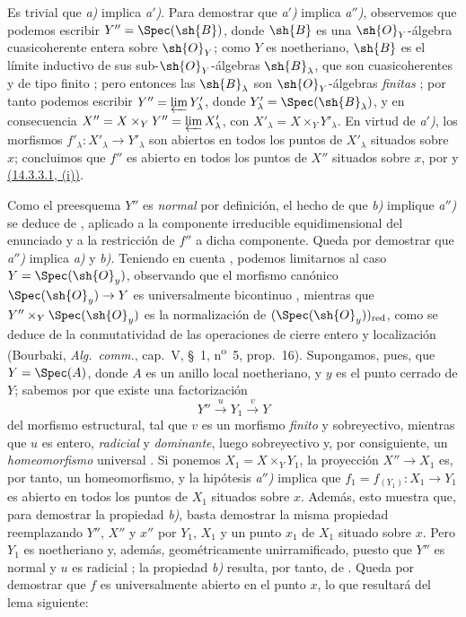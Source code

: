 Es trivial que \emph{a)} implica \emph{a$'$)}.
Para demostrar que \emph{a$'$)} implica \emph{a$''$)}, observemos que podemos escribir $Y''=\Spec(\sh{B})$, donde $\sh{B}$ es una $\sh{O}_Y$-álgebra cuasicoherente entera sobre $\sh{O}_Y$; como $Y$ es noetheriano, $\sh{B}$ es el límite inductivo de sus sub-$\sh{O}_Y$-álgebras $\sh{B}_\lambda$, que son cuasicoherentes y de tipo finito ; pero entonces las $\sh{B}_\lambda$ son $\sh{O}_Y$-álgebras \emph{finitas} ; por tanto podemos escribir $Y''=\varprojlim Y'_\lambda$, donde $Y'_\lambda=\Spec(\sh{B}_\lambda)$, y en consecuencia $X''=X\times_Y Y''=\varprojlim X'_\lambda$, con $X'_\lambda=X\times_Y Y'_\lambda$.
En virtud de \emph{a$'$)}, los morfismos $f'_\lambda:X'_\lambda\to Y'_\lambda$ son abiertos en todos los puntos de $X'_\lambda$ situados sobre $x$; concluimos que $f''$ es abierto en todos los puntos de $X''$ situados sobre $x$, por  y {\hyperlink{ega4.c04.subsec.14-3-3-1}{(14.3.3.1, (i))}}.

Como el preesquema $Y''$ es \emph{normal} por definición, el hecho de que \emph{b)} implique \emph{a$''$)} se deduce de , aplicado a la componente irreducible equidimensional del enunciado y a la restricción de $f''$ a dicha componente.
Queda por demostrar que \emph{a$''$)} implica \emph{a)} y \emph{b)}.
Teniendo en cuenta , podemos limitarnos al caso $Y=\Spec(\sh{O}_y)$, observando que el morfismo canónico $\Spec(\sh{O}_y)\to Y$ es universalmente bicontinuo , mientras que $Y''\times_Y\Spec(\sh{O}_y)$ es la normalización de $(\Spec(\sh{O}_y))_{\mathrm{red}}$, como se deduce de la conmutatividad de las operaciones de cierre entero y localización (Bourbaki, \emph{Alg.\ comm.}, cap.~V, \S~1, n\textsuperscript{o}~5, prop.~16).
Supongamos, pues, que $Y=\Spec(A)$, donde $A$ es un anillo local noetheriano, y $y$ es el punto cerrado de $Y$; sabemos por  que existe una factorización
\[
  Y'' \xrightarrow{u} Y_1 \xrightarrow{v} Y
\]
del morfismo estructural, tal que $v$ es un morfismo \emph{finito} y sobreyectivo, mientras que $u$ es entero, \emph{radicial} y \emph{dominante}, luego sobreyectivo  y, por consiguiente, un \emph{homeomorfismo} universal .
Si ponemos $X_1=X\times_Y Y_1$, la proyección $X''\to X_1$ es, por tanto, un homeomorfismo, y la hipótesis \emph{a$''$)} implica que $f_1=f_{(Y_1)}:X_1\to Y_1$ es abierto en todos los puntos de $X_1$ situados sobre $x$.
Además, esto muestra que, para demostrar la propiedad \emph{b)}, basta demostrar la misma propiedad reemplazando $Y''$, $X''$ y $x''$ por $Y_1$, $X_1$ y un punto $x_1$ de $X_1$ situado sobre $x$.
Pero $Y_1$ es noetheriano y, además, geométricamente unirramificado, puesto que $Y''$ es normal y $u$ es radicial ; la propiedad \emph{b)} resulta, por tanto, de .
Queda por demostrar que $f$ es universalmente abierto en el punto $x$, lo que resultará del lema siguiente:

